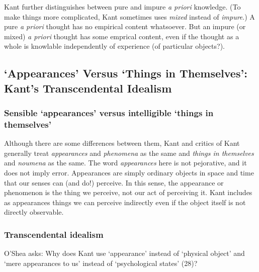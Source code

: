 \documentclass[12pt,letterpaper]{article}
\begin{document}
Kant further distinguishes between pure and impure \textit{a priori} knowledge.
(To make things more complicated, Kant sometimes uses \textit{mixed} instead of \textit{impure}.)
A pure \textit{a priori} thought has no empirical content whatsoever.
But an impure (or mixed) \textit{a priori} thought has some emprical content, even if the thought as a whole is knowlable independently of experience (of particular objects?).

\subsection*{`Appearances' Versus `Things in Themselves': Kant's Transcendental Idealism}


\subsubsection*{Sensible `appearances' versus intelligible `things in themselves'}

Although there are some differences between them, Kant and critics of Kant generally treat \textit{appearances} and \textit{phenomena} as the same and \textit{things in themselves} and \textit{noumena} as the same.
The word \textit{appearances} here is not pejorative, and it does not imply error.
Appearances are simply ordinary objects in space and time that our senses can (and do!) perceive.
In this sense, the appearance or phenomenon is the thing we perceive, not our act of perceiving it.
Kant includes as appearances things we can perceive indirectly even if the object itself is not directly observable.

\subsubsection*{Transcendental idealism}

O'Shea asks: Why does Kant use `appearance' instead of `physical object' and `mere appearances to us' instead of `psychological states' (28)?

\newpage
\pagestyle{references}

\printbibliography[filter=primary,title={Primary Sources}]
\printbibliography[filter=secondary,title={Secondary Sources}]
\end{document}
